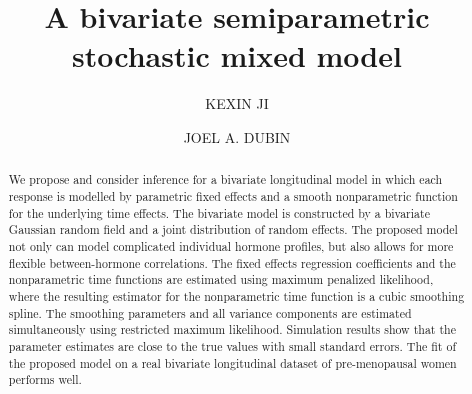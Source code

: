 \documentclass[article,lineno]{biometrika}
\begin{document}





\title{A bivariate semiparametric stochastic  mixed model}

\author{KEXIN JI \and JOEL A. DUBIN}


\maketitle

\begin{abstract}
We propose and consider inference for a bivariate longitudinal model in which each response is modelled by parametric fixed effects and a smooth nonparametric function for the underlying time effects.  The bivariate model is constructed by a bivariate Gaussian random field and a joint distribution of random effects. 
The proposed model not only can model complicated individual hormone profiles, but also allows for more flexible between-hormone correlations. 
The fixed effects regression coefficients and the nonparametric time functions are estimated using maximum penalized likelihood, where the resulting estimator for the nonparametric time function is a cubic smoothing spline. The smoothing parameters and all variance components are estimated simultaneously using restricted maximum likelihood.  Simulation results show that the parameter estimates are close to the true values with small standard errors. The fit of the proposed model on a real bivariate longitudinal dataset of pre-menopausal women performs well.
\end{abstract}
\end{document}
